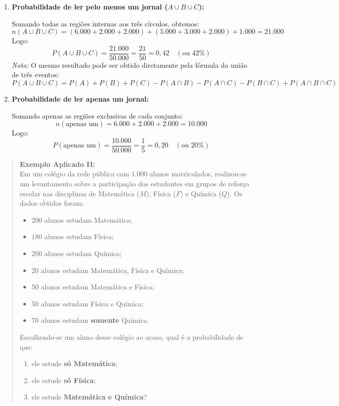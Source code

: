 \begin{enumerate}
    \item[a)] \textbf{Probabilidade de ler pelo menos um jornal ($A \cup B \cup C$):}
    
    Somando todas as regiões internas aos três círculos, obtemos:
    \[
    n(A \cup B \cup C) = (6.000 + 2.000 + 2.000) + (5.000 + 3.000 + 2.000) + 1.000 = 21.000
    \]
    Logo:
    \[
    P(A \cup B \cup C) = \frac{21.000}{50.000} = \frac{21}{50} = 0,42 \quad (\text{ou } 42\%)
    \]
    \textit{Nota:} O mesmo resultado pode ser obtido diretamente pela fórmula da união de três eventos:
    \[
    P(A \cup B \cup C) = P(A) + P(B) + P(C) - P(A \cap B) - P(A \cap C) - P(B \cap C) + P(A \cap B \cap C)
    \]

    \item[b)] \textbf{Probabilidade de ler apenas um jornal:}
    
    Somando apenas as regiões exclusivas de cada conjunto:
    \[
    n(\text{apenas um}) = 6.000 + 2.000 + 2.000 = 10.000
    \]
    Logo:
    \[
    P(\text{apenas um}) = \frac{10.000}{50.000} = \frac{1}{5} = 0,20 \quad (\text{ou } 20\%)
    \]
\end{enumerate}



\begin{quote}
\textbf{Exemplo Aplicado II:} \\
Em um colégio da rede pública com $1.000$ alunos matriculados, realizou-se um levantamento sobre a participação dos estudantes em grupos de reforço escolar nas disciplinas de Matemática ($M$), Física ($F$) e Química ($Q$). Os dados obtidos foram:
\begin{itemize}
    \item $200$ alunos estudam Matemática;
    \item $180$ alunos estudam Física;
    \item $200$ alunos estudam Química;
    \item $20$ alunos estudam Matemática, Física e Química;
    \item $50$ alunos estudam Matemática e Física;
    \item $50$ alunos estudam Física e Química;
    \item $70$ alunos estudam \textbf{somente} Química.
\end{itemize}
Escolhendo-se um aluno desse colégio ao acaso, qual é a probabilidade de que:
\begin{enumerate}
    \item[a)] ele estude \textbf{só Matemática};
    \item[b)] ele estude \textbf{só Física};
    \item[c)] ele estude \textbf{Matemática e Química}?
\end{enumerate}
\end{quote}

